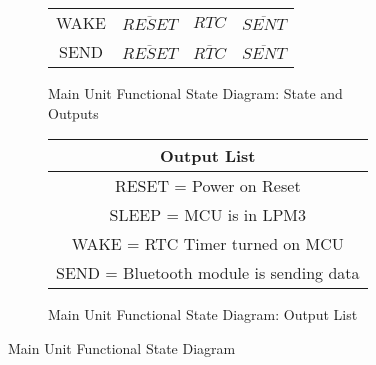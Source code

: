 \begin{landscape}
\begin{figure}[!ht]
\begin{center}
\begin{subfigure}[b]{0.5\textwidth}
\begin{tabular}{c|ccc}
        WAKE&$\overline{RESET}$&$RTC$&$\overline{SENT}$\\
        SEND&$\overline{RESET}$&$\overline{RTC}$&$\overline{SENT}$\\
      \end{tabular}
      \caption{Main Unit Functional State Diagram: State and Outputs}
      \label{fig:main-unit-fsd-state-outputs}
  \end{subfigure}
  \begin{subfigure}[b]{0.5\textwidth}
   \begin{tabular}{|c|}
    \hline
     Output List\\
    \hline
     RESET = Power on Reset\\
     SLEEP = MCU is in LPM3\\
     WAKE = RTC Timer turned on MCU\\
     SEND = Bluetooth module is sending data\\
    \hline
   \end{tabular}
      \caption{Main Unit Functional State Diagram: Output List}
      \label{fig:main-unit-fsd-outputs-list}
  \end{subfigure}
\end{center}
\caption{Main Unit Functional State Diagram}
\label{fig:main-unit-fsd}
\end{figure}
\end{landscape}
